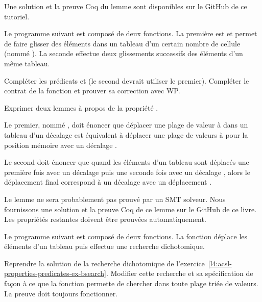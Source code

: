 Une solution et la preuve Coq du lemme sont disponibles sur le GitHub de ce tutoriel.


\label{l4:acsl-properties-lemmas-shift-trans}


Le programme suivant est composé de deux fonctions. La première est
 et permet de faire glisser des éléments dans un tableau
d'un certain nombre de cellule (nommé ). La seconde effectue deux
glissements successifs des éléments d'un même tableau.





Compléter les prédicats  et  (le second
devrait utiliser le premier). Compléter le contrat de la fonction
 et prouver sa correction avec WP.


Exprimer deux lemmes à propos de la propriété .


Le premier, nommé , doit énoncer que déplacer une plage de
valeur  à  dans un tableau 
d'un décalage  est équivalent à déplacer une plage de valeurs
 à  pour la position mémoire 
avec un décalage .


Le second doit énoncer que quand les éléments d'un tableau sont déplacés une première
fois avec un décalage  puis une seconde fois avec un décalage
, alors le déplacement final correspond à un décalage avec un
déplacement .


Le lemme  ne sera probablement pas prouvé par un SMT solveur.
Nous fournissons une solution et la preuve Coq de ce lemme sur le GitHub de ce livre.
Les propriétés restantes doivent être prouvées automatiquement.




Le programme suivant est composé de deux fonctions. La fonction
 déplace les éléments d'un tableau puis effectue
une recherche dichotomique.




Reprendre la solution de la recherche dichotomique de 
l'exercice~\ref{l4:acsl-properties-predicates-ex-bsearch}. Modifier cette
recherche et sa spécification de façon à ce que la fonction permette de
chercher dans toute plage triée de valeurs. La preuve doit toujours fonctionner.


